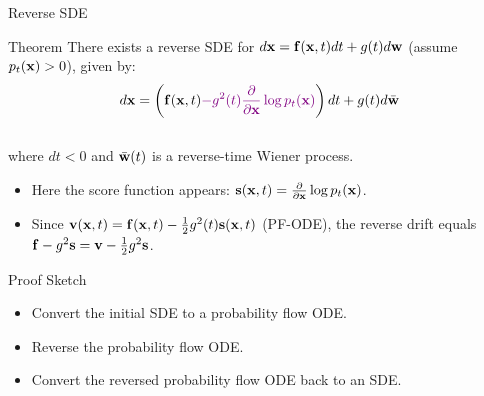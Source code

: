 \documentclass{beamer}
\renewcommand{\eqpause}{}
\begin{document}
\begin{frame}{Reverse SDE}
	\begin{block}{Theorem}
		There exists a reverse SDE for $d\mathbf{x} = \mathbf{f}(\mathbf{x}, t) dt + g(t) d \mathbf{w}$ (assume $p_t(\mathbf{x}) > 0$), given by:
		\vspace{-0.3cm}
		\[
			d\mathbf{x} = \left(\mathbf{f}(\mathbf{x}, t) {\color{violet}- g^2(t) \frac{\partial}{\partial \mathbf{x}}\log p_t(\mathbf{x})}\right) dt + g(t) d \bar{\mathbf{w}}
		\]
		\vspace{-0.5cm}\\
		where $dt<0$ and $\bar{\mathbf{w}}(t)$ is a reverse-time Wiener process.
	\end{block}
	\eqpause
	\begin{itemize}
		\item Here the score function appears: $\mathbf{s}(\mathbf{x}, t) = \frac{\partial}{\partial \mathbf{x}} \log p_t(\mathbf{x})$.
		\item Since $\mathbf{v}(\mathbf{x}, t) = \mathbf{f}(\mathbf{x}, t) - \frac{1}{2} g^2(t) \mathbf{s}(\mathbf{x}, t)$ (PF-ODE), the reverse drift equals $\mathbf{f} - g^2 \mathbf{s} = \mathbf{v} - \frac{1}{2} g^2 \mathbf{s}$.
	\end{itemize}
	\eqpause
	\begin{block}{Proof Sketch}
		\begin{itemize}
			\item Convert the initial SDE to a probability flow ODE.
			\item Reverse the probability flow ODE.
			\item Convert the reversed probability flow ODE back to an SDE.
		\end{itemize}
	\end{block}
\end{frame}
\end{document}
